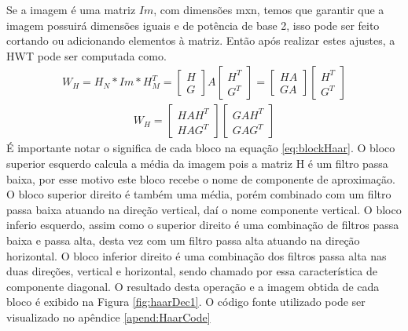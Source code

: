 \documentclass[
	article,			%
	11pt,				%
	oneside,			%
	a4paper,			%
	english,			%
	brazil,				%
	sumario=tradicional
	]{abntex2}
\begin{document}
Se a imagem é uma matriz $Im$, com dimensões mxn, temos que garantir que a
imagem possuirá dimensões iguais e de potência de base 2, isso pode ser feito
cortando ou adicionando elementos à matriz.
Então após realizar estes ajustes, a HWT pode ser computada como.
\begin{align}
W_H=H_N*Im*H_M^{T} =
\begin{bmatrix} H \\ G \end{bmatrix}
A
\begin{bmatrix} H^T \\ G^T \end{bmatrix}
=
\begin{bmatrix} HA \\ GA \end{bmatrix}
\begin{bmatrix} H^T \\ G^T \end{bmatrix}
\end{align}
\begin{align}
W_H=
\begin{bmatrix} HAH^T \\ HAG^T \end{bmatrix}
\begin{bmatrix} GAH^T \\ GAG^T \end{bmatrix}
\label{eq:blockHaar}
\end{align}
É importante notar o significa de cada bloco na equação \ref{eq:blockHaar}.
O bloco superior esquerdo calcula a média da imagem pois a matriz H é um filtro
passa baixa, por esse motivo este bloco recebe o nome de componente de
aproximação.
O bloco superior direito é também uma média, porém combinado com um filtro passa
baixa atuando na direção vertical, daí o nome componente vertical.
O bloco inferio esquerdo, assim como o superior direito é uma combinação de
filtros passa baixa e passa alta, desta vez com um filtro passa alta atuando na
direção horizontal.
O bloco inferior direito é uma combinação dos filtros passa alta nas duas
direções, vertical e horizontal, sendo chamado por essa característica de
componente diagonal.
O resultado desta operação e a imagem obtida de cada bloco é exibido na Figura
\ref{fig:haarDec1}.
O código fonte utilizado pode ser visualizado no apêndice \ref{apend:HaarCode}
\end{document}
